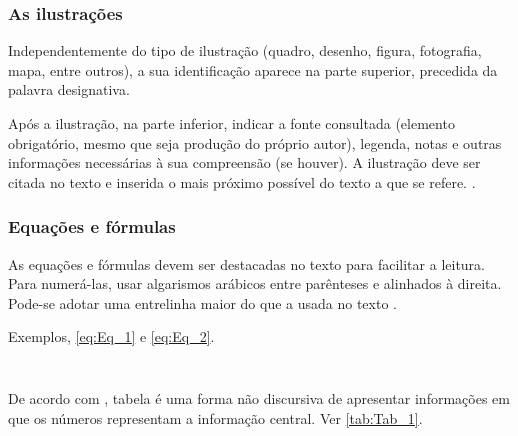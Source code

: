 \subsubsection{As ilustrações}

Independentemente do tipo de ilustração (quadro, desenho, figura, fotografia, mapa, entre outros), a sua identificação aparece na parte superior, precedida da palavra designativa. 

\begin{citacao}
	Após a ilustração, na parte inferior, indicar a fonte consultada (elemento obrigatório, mesmo que seja produção do próprio autor), legenda, notas e outras informações necessárias à sua compreensão (se houver). A ilustração deve ser citada no texto e inserida o mais próximo possível do texto a que se refere. \cite[p. 11]{NBR14724:2011}.
\end{citacao}

\subsubsection{Equações e fórmulas}

As equações e fórmulas devem ser destacadas no texto para facilitar a leitura.  Para numerá-las, usar algarismos arábicos entre parênteses e alinhados à direita. Pode-se adotar uma entrelinha maior do que a usada no texto \cite{NBR14724:2011}.

Exemplos, \autoref{eq:Eq_1} e \autoref{eq:Eq_2}.

\begin{equation}\label{eq:Eq_1}
\end{equation}

\begin{equation}\label{eq:Eq_2}
\end{equation}


De acordo com \textcite{ibge1993}, tabela é uma forma não discursiva de apresentar informações em que os números representam a informação central. Ver \autoref{tab:Tab_1}.

